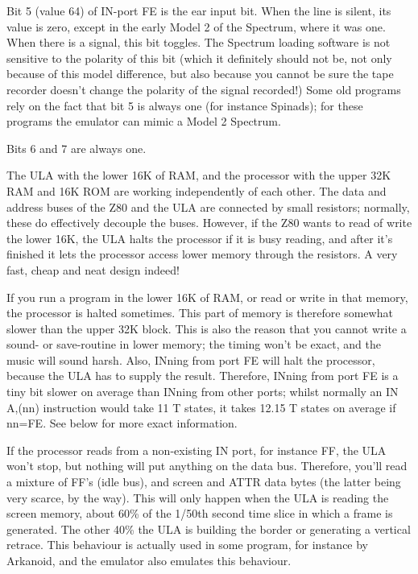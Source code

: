     Bit 5 (value 64) of IN-port FE is the ear input bit.  When the line is
    silent, its value is zero, except in the early Model 2 of the Spectrum,
    where it was one.  When there is a signal, this bit toggles.  The
    Spectrum loading software is not sensitive to the polarity of this bit
    (which it definitely should not be, not only because of this model
    difference, but also because you cannot be sure the tape recorder
    doesn't change the polarity of the signal recorded!) Some old programs
    rely on the fact that bit 5 is always one (for instance Spinads); for
    these programs the emulator can mimic a Model 2 Spectrum.

    Bits 6 and 7 are always one.

    The ULA with the lower 16K of RAM, and the processor with the upper 32K
    RAM and 16K ROM are working independently of each other.  The data and
    address buses of the Z80 and the ULA are connected by small resistors;
    normally, these do effectively decouple the buses.  However, if the Z80
    wants to read of write the lower 16K, the ULA halts the processor if it
    is busy reading, and after it's finished it lets the processor access
    lower memory through the resistors.  A very fast, cheap and neat design
    indeed!

    If you run a program in the lower 16K of RAM, or read or write in that
    memory, the processor is halted sometimes.  This part of memory is
    therefore somewhat slower than the upper 32K block.  This is also the
    reason that you cannot write a sound- or save-routine in lower memory;
    the timing won't be exact, and the music will sound harsh.  Also, INning
    from port FE will halt the processor, because the ULA has to supply the
    result.  Therefore, INning from port FE is a tiny bit slower on average
    than INning from other ports; whilst normally an IN A,(nn) instruction
    would take 11 T states, it takes 12.15 T states on average if nn=FE\@. See
    below for more exact information.

    If the processor reads from a non-existing IN port, for instance FF, the
    ULA won't stop, but nothing will put anything on the data bus.
    Therefore, you'll read a mixture of FF's (idle bus), and screen and ATTR
    data bytes (the latter being very scarce, by the way).  This will only
    happen when the ULA is reading the screen memory, about 60\% of the
    1/50th second time slice in which a frame is generated.  The other 40\%
    the ULA is building the border or generating a vertical retrace.  This
    behaviour is actually used in some program, for instance by Arkanoid,
    and the emulator also emulates this behaviour.


